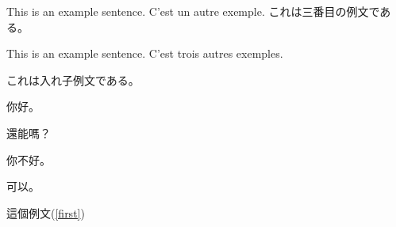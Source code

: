 \documentclass{article}
\begin{document}
\newpage
\begin{exe}
  \ex This is an example sentence.
  \ex C'est un autre exemple.
  \ex これは三番目の例文である。
\end{exe}

\begin{exe}
  \ex\label{first} This is an example sentence. %
  \ex C'est trois autres exemples.
    \begin{xlist} %
      \ex これは入れ子例文である。
        \begin{xlist} %
          \ex 你好。
            \begin{xlistI} %
              \ex 還能嗎？
            \end{xlistI}
          \ex 你不好。
            \begin{xlistA} %
              \ex 可以。
            \end{xlistA}
        \end{xlist}  
    \end{xlist}
\end{exe}
這個例文(\ref{first}) %
\end{document}
